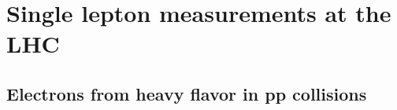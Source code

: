 


\section{Single lepton measurements at the LHC}

\subsection{Electrons from heavy flavor in pp collisions}

